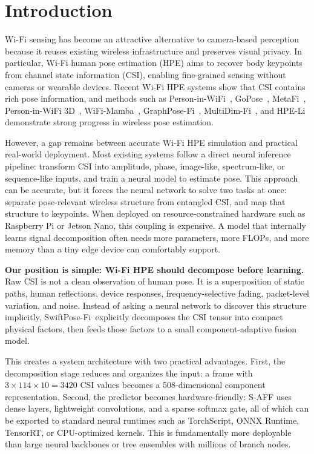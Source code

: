 \documentclass[10pt,conference]{IEEEtran}
\newcommand{\method}{SwiftPose-Fi}
\begin{document}
\section{Introduction}

Wi-Fi sensing has become an attractive alternative to camera-based perception because it reuses existing wireless infrastructure and preserves visual privacy. In particular, Wi-Fi human pose estimation (HPE) aims to recover body keypoints from channel state information (CSI), enabling fine-grained sensing without cameras or wearable devices. Recent Wi-Fi HPE systems show that CSI contains rich pose information, and methods such as Person-in-WiFi~\cite{personwifi2019}, GoPose~\cite{gopose2021}, MetaFi~\cite{metafi2022}, Person-in-WiFi 3D~\cite{personwifi3d2024}, WiFi-Mamba~\cite{wifimamba2026}, GraphPose-Fi~\cite{graphposefi2026}, MultiDim-Fi~\cite{multidimfi2025}, and HPE-Li~\cite{hpeli2024} demonstrate strong progress in wireless pose estimation.

However, a gap remains between accurate Wi-Fi HPE simulation and practical real-world deployment. Most existing systems follow a direct neural inference pipeline: transform CSI into amplitude, phase, image-like, spectrum-like, or sequence-like inputs, and train a neural model to estimate pose. This approach can be accurate, but it forces the neural network to solve two tasks at once: separate pose-relevant wireless structure from entangled CSI, and map that structure to keypoints. When deployed on resource-constrained hardware such as Raspberry Pi or Jetson Nano, this coupling is expensive. A model that internally learns signal decomposition often needs more parameters, more FLOPs, and more memory than a tiny edge device can comfortably support.

\textbf{Our position is simple: Wi-Fi HPE should decompose before learning.} Raw CSI is not a clean observation of human pose. It is a superposition of static paths, human reflections, device responses, frequency-selective fading, packet-level variation, and noise. Instead of asking a neural network to discover this structure implicitly, \method\ explicitly decomposes the CSI tensor into compact physical factors, then feeds those factors to a small component-adaptive fusion model.

This creates a system architecture with two practical advantages. First, the decomposition stage reduces and organizes the input: a frame with $3\times114\times10=3420$ CSI values becomes a 508-dimensional component representation. Second, the predictor becomes hardware-friendly: S-AFF uses dense layers, lightweight convolutions, and a sparse softmax gate, all of which can be exported to standard neural runtimes such as TorchScript, ONNX Runtime, TensorRT, or CPU-optimized kernels. This is fundamentally more deployable than large neural backbones or tree ensembles with millions of branch nodes.
\end{document}
